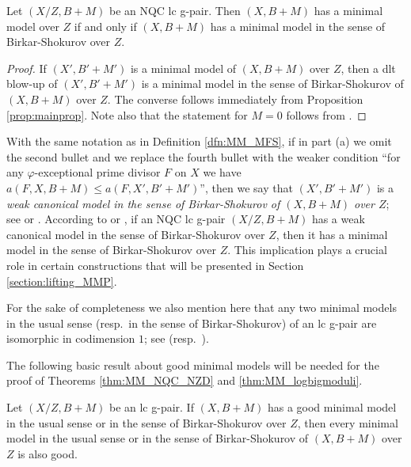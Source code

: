 	\begin{thm}
		Let $ (X/Z,B+M) $ be an NQC lc g-pair. Then $ (X,B+M) $ has a minimal model over $ Z $ if and only if $ (X,B+M) $ has a minimal model in the sense of Birkar-Shokurov over $ Z $.
	\end{thm}
	
	\begin{proof}
		If $ (X',B'+M') $ is a minimal model of $ (X,B+M) $ over $ Z $, then a dlt blow-up of $ (X',B'+M') $ is a minimal model in the sense of Birkar-Shokurov of $ (X,B+M) $ over $ Z $. The converse follows immediately from Proposition \ref{prop:mainprop}. Note also that the statement for $M=0$ follows from \cite[Theorem 1.7]{HH20}.
	\end{proof}
	
	\begin{rem}\label{rem:WCM_EMM}
		With the same notation as in Definition \ref{dfn:MM_MFS}, if in part (a) we omit the second bullet and we replace the fourth bullet with the weaker condition \enquote{for any $\varphi $-exceptional prime divisor $ F $ on $ X $ we have $ a(F,X,B+M) \leq a(F,X',B'+M') $}, then we say that $(X',B'+M')$ is a \emph{weak canonical model in the sense of Birkar-Shokurov of $(X,B+M)$ over $Z$}; see \cite[Definition 2.26]{Tsak21} or \cite[Definition 3.2(2)]{HaconLiu21}. According to \cite[Proposition 2.33]{Tsak21} or \cite[Lemma 3.15]{HaconLiu21}, if an NQC lc g-pair $ (X/Z,B+M) $ has a weak canonical model in the sense of Birkar-Shokurov over $Z$, then it has a minimal model in the sense of Birkar-Shokurov over $Z$. This implication plays a crucial role in certain constructions that will be presented in Section \ref{section:lifting_MMP}.
	\end{rem}
	
	For the sake of completeness we also mention here that any two minimal models in the usual sense (resp.\ in the sense of Birkar-Shokurov) of an lc g-pair are isomorphic in codimension $ 1 $; see \cite[Lemma 2.12]{CT20} (resp.\ \cite[Lemma 3.1]{Chaud22c}).
	
	\medskip
	
	The following basic result about good minimal models will be needed for the proof of Theorems \ref{thm:MM_NQC_NZD} and \ref{thm:MM_logbigmoduli}.
	
	\begin{lem}\label{lem:GMM}
		Let $(X/Z,B+M)$ be an lc g-pair. If $ (X,B+M) $ has a good minimal model in the usual sense or in the sense of Birkar-Shokurov over $ Z $, then every minimal model in the usual sense or in the sense of Birkar-Shokurov of $ (X,B+M) $ over $ Z $ is also good.
	\end{lem}
	

